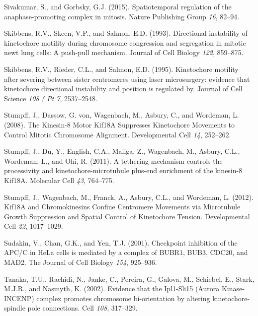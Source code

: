 \documentclass[12pt,a4paper,twoside,openright]{book}
\begin{document}
Sivakumar, S., and Gorbsky, G.J. (2015). Spatiotemporal regulation of
the anaphase-promoting complex in mitosis. Nature Publishing Group
\emph{16}, 82--94.

Skibbens, R.V., Skeen, V.P., and Salmon, E.D. (1993). Directional
instability of kinetochore motility during chromosome congression and
segregation in mitotic newt lung cells: A push-pull mechanism. Journal
of Cell Biology \emph{122}, 859--875.

Skibbens, R.V., Rieder, C.L., and Salmon, E.D. (1995). Kinetochore
motility after severing between sister centromeres using laser
microsurgery: evidence that kinetochore directional instability and
position is regulated by. Journal of Cell Science \emph{108 ( Pt 7},
2537--2548.

Stumpff, J., Dassow, G. von, Wagenbach, M., Asbury, C., and Wordeman, L.
(2008). The Kinesin-8 Motor Kif18A Suppresses Kinetochore Movements to
Control Mitotic Chromosome Alignment. Developmental Cell \emph{14},
252--262.

Stumpff, J., Du, Y., English, C.A., Maliga, Z., Wagenbach, M., Asbury,
C.L., Wordeman, L., and Ohi, R. (2011). A tethering mechanism controls
the processivity and kinetochore-microtubule plus-end enrichment of the
kinesin-8 Kif18A. Molecular Cell \emph{43}, 764--775.

Stumpff, J., Wagenbach, M., Franck, A., Asbury, C.L., and Wordeman, L.
(2012). Kif18A and Chromokinesins Confine Centromere Movements via
Microtubule Growth Suppression and Spatial Control of Kinetochore
Tension. Developmental Cell \emph{22}, 1017--1029.

Sudakin, V., Chan, G.K., and Yen, T.J. (2001). Checkpoint inhibition of
the APC/C in HeLa cells is mediated by a complex of BUBR1, BUB3, CDC20,
and MAD2. The Journal of Cell Biology \emph{154}, 925--936.

Tanaka, T.U., Rachidi, N., Janke, C., Pereira, G., Galova, M., Schiebel,
E., Stark, M.J.R., and Nasmyth, K. (2002). Evidence that the Ipl1-Sli15
(Aurora Kinase-INCENP) complex promotes chromosome bi-orientation by
altering kinetochore-spindle pole connections. Cell \emph{108},
317--329.
\end{document}
